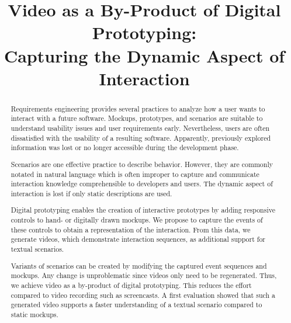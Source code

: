 \documentclass[conference]{IEEEtran}
\begin{document}
\title{Video as a By-Product of Digital Prototyping: \\Capturing the Dynamic 
Aspect of Interaction}

\author{
}
\maketitle

\begin{abstract}
Requirements engineering provides several practices to analyze how a user 
wants to interact with a future software. Mockups, prototypes, and scenarios 
are suitable to understand usability issues and user requirements early. 
Nevertheless, users are often dissatisfied with the usability of a resulting 
software. Apparently, previously explored information was lost or no 
longer accessible during the development phase.

Scenarios are one effective practice to describe behavior. However, they are 
commonly notated in natural language which is often improper to capture 
and communicate interaction knowledge comprehensible to developers and users. 
The dynamic aspect of interaction is lost if only static descriptions are used.

Digital prototyping enables the creation of interactive prototypes by adding 
responsive controls to hand- or digitally drawn mockups. We propose to capture 
the events of these controls to obtain a representation of the interaction. 
From this data, we generate videos, which demonstrate interaction 
sequences, as additional support for textual scenarios.

Variants of scenarios can be created by modifying the captured event 
sequences and mockups. Any change is unproblematic since videos only need to be 
regenerated. Thus, we achieve video as a by-product of digital prototyping. 
This reduces the effort compared to video recording such as screencasts. A 
first evaluation showed that such a generated video supports a faster 
understanding of a textual scenario compared to static mockups.

\end{abstract}
\end{document}
